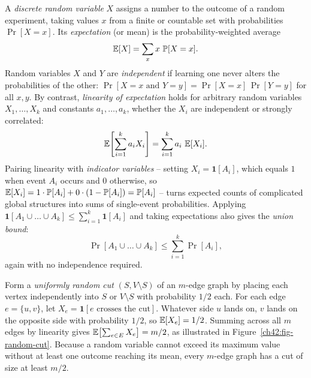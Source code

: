 A \emph{discrete random variable} $X$ assigns a number to the outcome of a random experiment, taking values $x$ from a finite or countable set with probabilities $\Pr[X = x]$. Its \emph{expectation} (or mean) is the probability-weighted average
\[
  \operatorname{\mathbb{E}}[X] = \sum_x x\,\operatorname{\mathbb{P}}[X = x].
\]
Random variables $X$ and $Y$ are \emph{independent} if learning one never alters the probabilities of the other: $\Pr[X = x \text{ and } Y = y] = \Pr[X = x]\,\Pr[Y = y]$ for all $x, y$. By contrast, \emph{linearity of expectation} holds for arbitrary random variables $X_1,\dots,X_k$ and constants $a_1,\dots,a_k$, whether the $X_i$ are independent or strongly correlated:
\[
  \operatorname{\mathbb{E}}\!\left[\sum_{i=1}^k a_i X_i\right] = \sum_{i=1}^k a_i\,\operatorname{\mathbb{E}}[X_i].
\]
Pairing linearity with \emph{indicator variables} -- setting $X_i = \mathbf{1}[A_i]$, which equals $1$ when event $A_i$ occurs and $0$ otherwise, so $\operatorname{\mathbb{E}}[X_i] = 1\cdot\operatorname{\mathbb{P}}[A_i] + 0\cdot(1-\operatorname{\mathbb{P}}[A_i]) = \operatorname{\mathbb{P}}[A_i]$ -- turns expected counts of complicated global structures into sums of single-event probabilities. Applying $\mathbf{1}[A_1 \cup \dots \cup A_k] \le \sum_{i=1}^k \mathbf{1}[A_i]$ and taking expectations also gives the \emph{union bound}:
\[
  \Pr[A_1 \cup \dots \cup A_k] \le \sum_{i=1}^k \Pr[A_i],
\]
again with no independence required.

\begin{example}
\label{ch42:ex-indicator}
Form a \emph{uniformly random cut} $(S, V\setminus S)$ of an $m$-edge graph by placing each vertex independently into $S$ or $V\setminus S$ with probability $1/2$ each. For each edge $e = \{u,v\}$, let $X_e = \mathbf{1}[e \text{ crosses the cut}]$. Whatever side $u$ lands on, $v$ lands on the opposite side with probability $1/2$, so $\operatorname{\mathbb{E}}[X_e] = 1/2$. Summing across all $m$ edges by linearity gives $\operatorname{\mathbb{E}}\bigl[\sum_{e\in E} X_e\bigr] = m/2$, as illustrated in Figure~\ref{ch42:fig-random-cut}. Because a random variable cannot exceed its maximum value without at least one outcome reaching its mean, every $m$-edge graph has a cut of size at least $m/2$.
\end{example}

